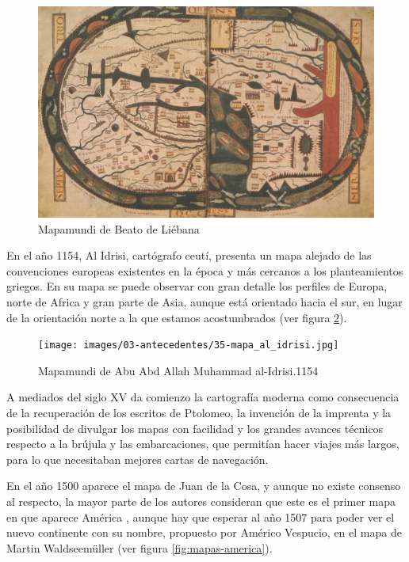 \begin{figure}[h!btp]
\centering
\includegraphics[width=160mm, fbox={\fboxrule} 0mm]{images/03-antecedentes/34-mapa_beato_liebana.jpg}
\caption{Mapamundi de Beato de Liébana}
\label{fig:mapa-beato-liebana}
\end{figure}

En el año 1154, Al Idrisi, cartógrafo ceutí, presenta un mapa alejado de las convenciones europeas existentes en la época y más cercanos a los planteamientos griegos. En su mapa se puede observar con gran detalle los perfiles de Europa, norte de Africa y gran parte de Asia, aunque está orientado hacia el sur, en lugar de la orientación norte a la que estamos acostumbrados (ver figura \ref{fig:mapa-al-idrisi}).

\begin{figure}[h!btp]
\centering
\texttt{[image: images/03-antecedentes/35-mapa\_al\_idrisi.jpg]}
\caption{Mapamundi de Abu Abd Allah Muhammad al-Idrisi.1154}
\label{fig:mapa-al-idrisi}
\end{figure}

A mediados del siglo XV da comienzo la cartografía moderna como consecuencia de la recuperación de los escritos de Ptolomeo, la invención de la imprenta y la posibilidad de divulgar los mapas con facilidad y los grandes avances técnicos respecto a la brújula y las embarcaciones, que permitían hacer viajes más largos, para lo que necesitaban mejores cartas de navegación.

En el año 1500 aparece el mapa de Juan de la Cosa, y aunque no existe consenso al respecto, la mayor parte de los autores consideran que este es el primer mapa en que aparece América \cite{Verl06}, aunque hay que esperar al año 1507 para poder ver el nuevo continente con su nombre, propuesto por Américo Vespucio, en el mapa de Martin Waldseemüller (ver figura \ref{fig:mapas-america}).


